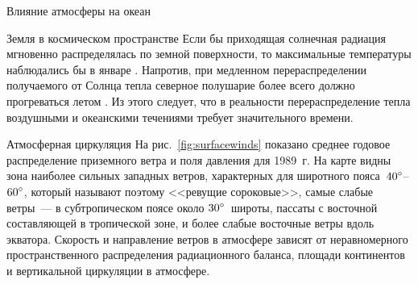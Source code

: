 \begin{chapter}{Влияние атмосферы на океан}
\begin{section}{Земля в космическом пространстве}
Если бы приходящая солнечная радиация мгновенно распределялась по
земной поверхности, то максимальные температуры наблюдались бы в
январе%
. 
Напротив, при медленном перераспределении получаемого от Солнца тепла северное
полушарие более всего должно прогреваться летом%
. 
Из этого следует, что в
реальности перераспределение тепла воздушными и океанскими течениями
требует значительного времени.
%
\end{section}

\begin{section}{Атмосферная циркуляция}
На рис.~\ref{fig:surfacewinds} показано среднее годовое распределение 
приземного ветра и поля давления для 1989~г. На карте видны зона наиболее 
сильных западных ветров, характерных для широтного 
пояса~${40}^\circ$--${60}^\circ$,
который называют поэтому <<ревущие сороковые>>, самые слабые ветры~--- в
субтропическом поясе около ${30}^\circ$~широты, пассаты с восточной
составляющей в тропической зоне, и более слабые восточные ветры вдоль
экватора. Скорость и направление ветров в атмосфере зависят от
неравномерного пространственного распределения радиационного баланса,
площади континентов и вертикальной циркуляции в атмосфере.
%


\end{section}
\end{chapter}
